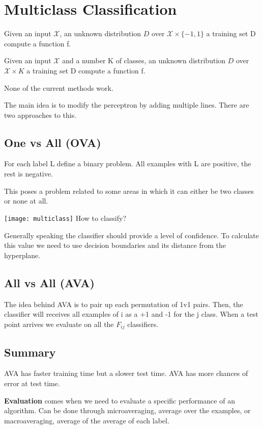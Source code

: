 
\chapter{Multiclass Classification}
\begin{definition}
	Given an input $\mathscr{X}$, an unknown distribution $D$ over $\mathscr{X}\times \{-1,1\}$
	a training set D compute a function f.
\end{definition}

\begin{definition}
	Given an input $\mathscr{X}$ and a number K of classes, an unknown distribution $D$ over $\mathscr{X}\times K$
	a training set D compute a function f.
\end{definition}

None of the current methods work.

The main idea is to modify the perceptron by adding multiple lines. There are two approaches to this.

\section{One vs All (OVA)}

For each label L define a binary problem. All examples with L are positive, the rest is negative.

This poses a problem related to some areas in which it can either be two classes or none at all.

\texttt{[image: multiclass]}
 How to classify? 

Generally speaking the classifier should provide a level of confidence. To calculate this value we need to use decision boundaries and its distance from the hyperplane.
 
\section{All vs All (AVA)}
The idea behind AVA is to pair up each permutation of 1v1 pairs. Then, the classifier will receives all examples of i as a +1 and -1 for the j class. When a test point arrives we evaluate on all the $F_{ij}$ classifiers. 

\section{Summary}
AVA has faster training time but a slower test time. AVA has more chances of error at test time.

\textbf{Evaluation} comes when we need to evaluate a specific performance of an algorithm. Can be done through microaveraging, average over the examples, or macroaveraging, average of the average of each label.

